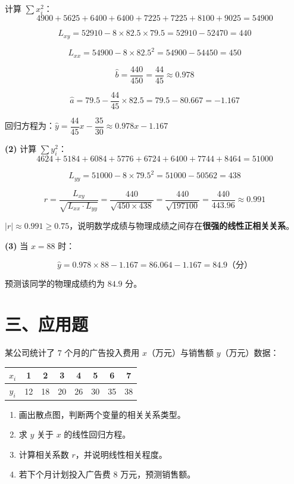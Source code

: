 \documentclass[12pt, a4paper]{ctexart}
\begin{document}
计算 $\sum x_i^2$：
\[
4900 + 5625 + 6400 + 6400 + 7225 + 7225 + 8100 + 9025 = 54900
\]

\[
L_{xy} = 52910 - 8 \times 82.5 \times 79.5 = 52910 - 52470 = 440
\]

\[
L_{xx} = 54900 - 8 \times 82.5^2 = 54900 - 54450 = 450
\]

\[
\hat{b} = \frac{440}{450} = \frac{44}{45} \approx 0.978
\]

\[
\hat{a} = 79.5 - \frac{44}{45} \times 82.5 = 79.5 - 80.667 = -1.167
\]

回归方程为：$\boxed{\hat{y} = \dfrac{44}{45}x - \dfrac{35}{30} \approx 0.978x - 1.167}$

\medskip
\textbf{(2)} 计算 $\sum y_i^2$：
\[
4624 + 5184 + 6084 + 5776 + 6724 + 6400 + 7744 + 8464 = 51000
\]

\[
L_{yy} = 51000 - 8 \times 79.5^2 = 51000 - 50562 = 438
\]

\[
r = \frac{L_{xy}}{\sqrt{L_{xx} \cdot L_{yy}}} = \frac{440}{\sqrt{450 \times 438}} = \frac{440}{\sqrt{197100}} = \frac{440}{443.96} \approx 0.991
\]

$|r| \approx 0.991 \geqslant 0.75$，说明数学成绩与物理成绩之间存在\textbf{很强的线性正相关关系}。

\medskip
\textbf{(3)} 当 $x = 88$ 时：

\[
\hat{y} = 0.978 \times 88 - 1.167 = 86.064 - 1.167 = 84.9 \text{（分）}
\]

预测该同学的物理成绩约为 $\boxed{84.9}$ 分。

\newpage

\section*{\textcolor{apppurple}{三、应用题}}

\begin{appbox}[【应用1】广告投入与销售额]
某公司统计了 $7$ 个月的广告投入费用 $x$（万元）与销售额 $y$（万元）数据：

\begin{center}
\begin{tabular}{c|ccccccc}
\toprule
$x_i$ & 1 & 2 & 3 & 4 & 5 & 6 & 7 \\
\midrule
$y_i$ & 12 & 18 & 20 & 26 & 30 & 35 & 38 \\
\bottomrule
\end{tabular}
\end{center}

\begin{enumerate}[label=(\arabic*)]
  \item 画出散点图，判断两个变量的相关关系类型。
  \item 求 $y$ 关于 $x$ 的线性回归方程。
  \item 计算相关系数 $r$，并说明线性相关程度。
  \item 若下个月计划投入广告费 $8$ 万元，预测销售额。
\end{enumerate}
\end{appbox}
\end{document}
